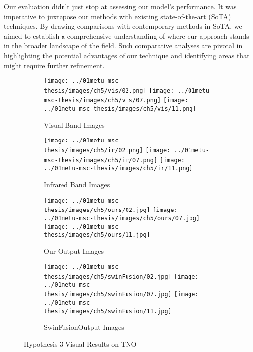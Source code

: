 Our evaluation didn't just stop at assessing our model's performance. It was imperative to juxtapose our methods with existing state-of-the-art (SoTA) techniques. By drawing comparisons with contemporary methods in SoTA, we aimed to establish a comprehensive understanding of where our approach stands in the broader landscape of the field. Such comparative analyses are pivotal in highlighting the potential advantages of our technique and identifying areas that might require further refinement.

\begin{figure}[htbp]
    \centering
    \begin{subfigure}[b]{\textwidth}
        \texttt{[image: ../01metu-msc-thesis/images/ch5/vis/02.png]}
        \texttt{[image: ../01metu-msc-thesis/images/ch5/vis/07.png]}
        \texttt{[image: ../01metu-msc-thesis/images/ch5/vis/11.png]}
        \caption{Visual Band Images}
        \label{fig:ch5:met4:vis}
    \end{subfigure}
    \vspace{0.01cm}
    \begin{subfigure}[b]{\textwidth}
        \texttt{[image: ../01metu-msc-thesis/images/ch5/ir/02.png]}
        \texttt{[image: ../01metu-msc-thesis/images/ch5/ir/07.png]}
        \texttt{[image: ../01metu-msc-thesis/images/ch5/ir/11.png]}
        \caption{Infrared Band Images}
        \label{fig:ch5:met4:ir}
    \end{subfigure}
    \vspace{0.01cm}
    \begin{subfigure}[b]{\textwidth}
        \texttt{[image: ../01metu-msc-thesis/images/ch5/ours/02.jpg]}
        \texttt{[image: ../01metu-msc-thesis/images/ch5/ours/07.jpg]}
        \texttt{[image: ../01metu-msc-thesis/images/ch5/ours/11.jpg]}
        \caption{Our Output Images}
        \label{fig:ch5:met4:ours}
    \end{subfigure}
    \vspace{0.01cm}
    \begin{subfigure}[b]{\textwidth}
        \texttt{[image: ../01metu-msc-thesis/images/ch5/swinFusion/02.jpg]}
        \texttt{[image: ../01metu-msc-thesis/images/ch5/swinFusion/07.jpg]}
        \texttt{[image: ../01metu-msc-thesis/images/ch5/swinFusion/11.jpg]}
        \caption{SwinFusion\cite{ma2022swinfusion}Output Images}
        \label{fig:ch5:met4:swin}
    \end{subfigure}
    \caption{Hypothesis 3 Visual Results on TNO}
    \label{fig:ch5:met4}
\end{figure}

